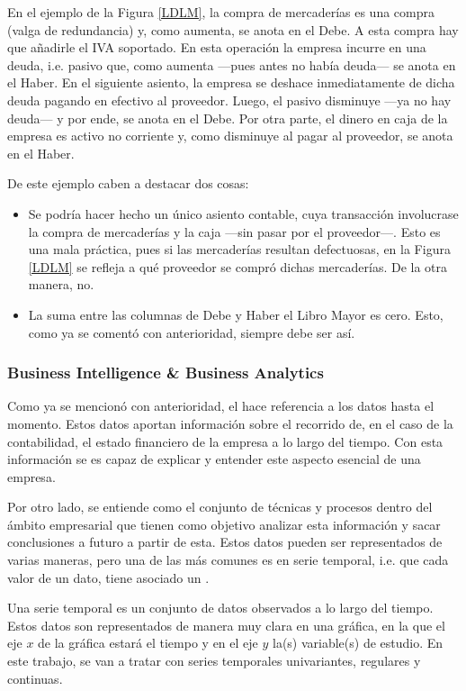 En el ejemplo de la Figura \ref{LDLM}, la compra de mercaderías es una compra (valga de redundancia) y, como aumenta, se anota en el Debe. A esta compra hay que añadirle el IVA soportado. En esta operación la empresa incurre en una deuda, i.e. pasivo que, como aumenta ---pues antes no había deuda--- se anota en el Haber. En el siguiente asiento, la empresa se deshace inmediatamente de dicha deuda pagando en efectivo al proveedor. Luego, el pasivo disminuye ---ya no hay deuda--- y por ende, se anota en el Debe. Por otra parte, el dinero en caja de la empresa es activo no corriente y, como disminuye al pagar al proveedor, se anota en el Haber. 

De este ejemplo caben a destacar dos cosas:
\begin{itemize}
    \item Se podría hacer hecho un único asiento contable, cuya transacción involucrase la compra de mercaderías y la caja ---sin pasar por el proveedor---. Esto es una mala práctica, pues si las mercaderías resultan defectuosas, en la Figura \ref{LDLM} se refleja a qué proveedor se compró dichas mercaderías. De la otra manera, no. 
    \item La suma entre las columnas de Debe y Haber el Libro Mayor es cero. Esto, como ya se comentó con anterioridad, siempre debe ser así.
\end{itemize}


\subsubsection{Business Intelligence \& Business Analytics}
Como ya se mencionó con anterioridad, el  hace referencia a los datos hasta el momento. Estos datos aportan información sobre el recorrido de, en el caso de la contabilidad, el estado financiero de la empresa a lo largo del tiempo. Con esta información se es capaz de explicar y entender este aspecto esencial de una empresa.

Por otro lado,  se entiende como el conjunto de técnicas y procesos dentro del ámbito empresarial que tienen como objetivo analizar esta información y sacar conclusiones a futuro a partir de esta. Estos datos pueden ser representados de varias maneras, pero una de las más comunes es en serie temporal, i.e. que cada valor de un dato, tiene asociado un . 

Una serie temporal es un conjunto de datos observados a lo largo del tiempo. Estos datos son representados de manera muy clara en una gráfica, en la que el eje $x$ de la gráfica estará el tiempo y en el eje $y$ la(s) variable(s) de estudio. En este trabajo, se van a tratar con series temporales univariantes, regulares y continuas.

